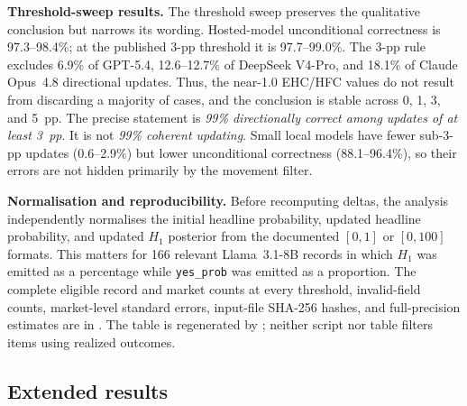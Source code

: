 \begin{center}
\begin{minipage}{\linewidth}
\centering
{}
\label{tab:exp1-threshold-robustness}
\scriptsize
\setlength{\tabcolsep}{4pt}
\resizebox{\linewidth}{!}{%

}
\end{minipage}
\end{center}

\noindent\textbf{Threshold-sweep results.}
The threshold sweep preserves the qualitative conclusion but narrows its
wording. Hosted-model unconditional correctness is 97.3--98.4\%; at the
published 3-pp threshold it is 97.7--99.0\%. The 3-pp rule excludes 6.9\% of
GPT-5.4, 12.6--12.7\% of DeepSeek V4-Pro, and 18.1\% of Claude Opus~4.8
directional updates. Thus, the near-1.0 EHC/HFC values do not result from
discarding a majority of cases, and the conclusion is stable across 0, 1, 3,
and 5~pp. The precise statement is \emph{99\% directionally correct among updates
of at least 3~pp}. It is not \emph{99\% coherent updating}. Small local
models have fewer sub-3-pp updates (0.6--2.9\%) but lower unconditional
correctness (88.1--96.4\%), so their errors are not hidden primarily by the
movement filter.

\noindent\textbf{Normalisation and reproducibility.}
Before recomputing deltas, the analysis independently normalises the initial
headline probability, updated headline probability, and updated $H_1$
posterior from the documented $[0,1]$ or $[0,100]$ formats. This matters for
166 relevant Llama~3.1-8B records in which $H_1$ was emitted as a percentage
while \texttt{yes\_prob} was emitted as a proportion. The complete eligible
record and market counts at every threshold, invalid-field counts, market-level
standard errors, input-file SHA-256 hashes, and full-precision estimates are in
. The table is
regenerated by
; neither script
nor table filters items using realized outcomes.

\subsection{Extended results}
\label{app:extended-results}

